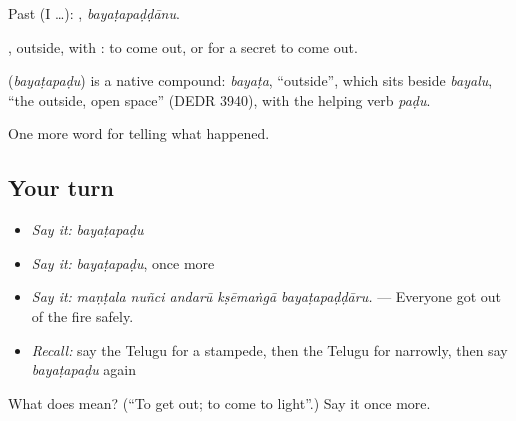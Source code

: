 Past (I …): , \emph{bayaṭapaḍḍānu}.

, outside, with : to come out, or for a secret to come out.

\begin{cousinweb}
\textbf{} (\emph{bayaṭapaḍu}) is a native compound: \emph{bayaṭa}, \textquotedblleft{}outside\textquotedblright{}, which sits beside \emph{bayalu}, \textquotedblleft{}the outside, open space\textquotedblright{} (DEDR 3940), with the helping verb \emph{paḍu}.
\end{cousinweb}

\begin{grammarlens}[title={What you've built}]
One more word for telling what happened.
\end{grammarlens}

\subsection*{Your turn}
\begin{itemize}
\raggedright
  \item \emph{Say it:} \emph{bayaṭapaḍu}
  \item \emph{Say it:} \emph{bayaṭapaḍu}, once more
  \item \emph{Say it:} \emph{maṇṭala nuñci andarū kṣēmaṅgā bayaṭapaḍḍāru.} — Everyone got out of the fire safely.
  \item \emph{Recall:} say the Telugu for a stampede, then the Telugu for narrowly, then say \emph{bayaṭapaḍu} again
\end{itemize}

\begin{tcolorbox}[breakable,colback=teal!4,colframe=teal!35!black,title={Before you move on}]
What does  mean? (\textquotedblleft{}To get out; to come to light\textquotedblright{}.) Say it once more.
\end{tcolorbox}
